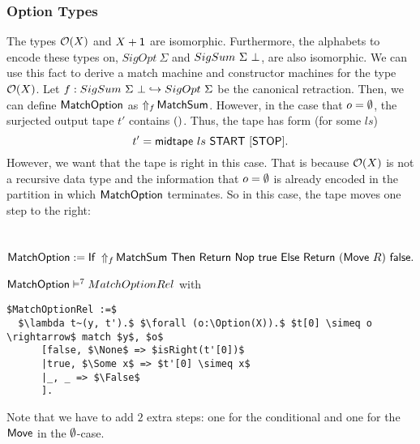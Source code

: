 \subsubsection{Option Types}
\label{sec:match-option}

The types $\Option(X)$ and $X+\Unit$ are isomorphic.  Furthermore, the alphabets to encode these types on, $SigOpt~\Sigma$ and $SigSum~\Sigma~\False$,
are also isomorphic.  We can use this fact to derive a match machine and constructor machines for the type $\Option(X)$.  Let
$f : SigSum~\Sigma~\False \hookrightarrow SigOpt~\Sigma$ be the canonical retraction.  Then, we can define $\MS{MatchOption}$ as
$\LiftAlphabet{\MS{MatchSum}}{f}$.  However, in the case that $o=\None$, the surjected output tape $t'$ contains $\unit$.  Thus, the tape has form
(for some $ls$)
\[ t' = \MS{midtape}~ls~\MS{START}~[\MS{STOP}]. \] However, we want that the tape is right in this case.  That is because $\Option(X)$ is not a
recursive data type and the information that $o=\None$ is already encoded in the partition in which $\MS{MatchOption}$ terminates.  So in this case,
the tape moves one step to the right:
\begin{definition}[$\MS{MatchOption}$]
  \label{def:MatchOption}
  ~
  \[
    \MS{MatchOption} := \If{\LiftAlphabet{\MS{MatchSum}}{f}}{\Return{\Nop}{\true}}{\Return{(\MS{Move}~R)}{\false}}.
  \]
\end{definition}

\begin{lemma}
  \label{lem:MatchSum_Realise}
  $\MS{MatchOption} \RealiseIn7 MatchOptionRel$ with
\begin{lstlisting}[style=semicoqstyle]
$MatchOptionRel :=$
  $\lambda t~(y, t').$ $\forall (o:\Option(X)).$ $t[0] \simeq o \rightarrow$ match $y$, $o$
      [false, $\None$ => $isRight(t'[0])$
      |true, $\Some x$ => $t'[0] \simeq x$
      |_, _ => $\False$
      ].
\end{lstlisting}
\end{lemma}
Note that we have to add $2$ extra steps: one for the conditional and one for the $\MS{Move}$ in the $\None$-case.

